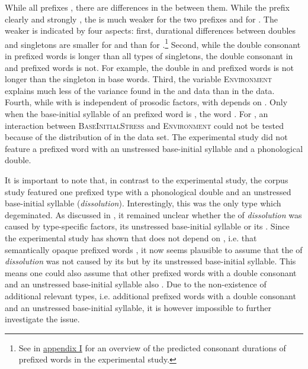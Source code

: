 While all prefixes , there are differences in the  between them. While the prefix  clearly and strongly , the  is much weaker for the two prefixes and for . The weaker  is indicated by four aspects: first, durational differences between doubles and singletons are smaller for  and  than for .\footnote{See  in \hyperref[Appendix I: Predicted Durations Experiment]{appendix I} for an overview of the predicted consonant durations of prefixed words in the experimental study.} Second, while the double consonant in prefixed words is longer than all types of singletons, the double consonant in  and prefixed words is not. For example, the double in  and prefixed words is not longer than the singleton in base words. Third, the variable \textsc{Environment} explains much less of the variance found in the  and data than in the data. 
Fourth, while  with  is independent of prosodic factors,  with  depends on . Only when the base-initial syllable of an prefixed word is , the word . For , an interaction between \textsc{BaseInitialStress} and \textsc{Environment} could not be tested because of the distribution of  in the data set. The experimental study did not feature a prefixed word with an unstressed base-initial syllable and a phonological double.

It is important to note that, in contrast to the experimental study, the corpus study featured one prefixed type with a phonological double and an unstressed base-initial syllable (\textit{dissolution}). Interestingly, this was the only type which degeminated. As discussed in , it remained unclear whether the  of \textit{dissolution} was caused by type-specific factors, its unstressed base-initial syllable or its .
Since the experimental study has shown that  does not depend on , i.e. that semantically opaque prefixed words ,  it now seems plausible to assume that the  of \textit{dissolution} was not  caused by its  but by its unstressed base-initial syllable. This means one could also assume that other prefixed words with a double consonant and an unstressed base-initial syllable also . Due to the non-existence of additional relevant types, i.e. additional prefixed words with a double consonant and an unstressed base-initial syllable, it is however impossible to further investigate the issue. 




